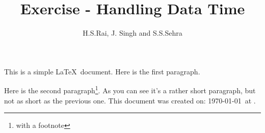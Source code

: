 \documentclass[12pt]{scrartcl}
\author{H.S.Rai, J. Singh and S.S.Sehra}
\title{Exercise - Handling Data Time}
\begin{document}
\maketitle

This is a simple \LaTeX\ document.
Here is the first paragraph.

Here is the second paragraph\footnote{with a footnote}. 
As you can see it's a rather short paragraph, but not 
as short as the previous one. This document was 
created on: \today\ at \currenttime.
\end{document}
